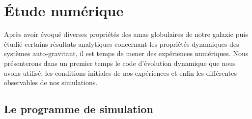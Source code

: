 \chapter{Étude numérique}
\label{Chap::Simu::Analysis}
	\minitoc

	Après avoir évoqué diverses propriétés des amas globulaires de notre galaxie puis étudié certains résultats
	analytiques concernant les propriétés dynamiques des systèmes auto-gravitant, il est temps de mener des
	expériences numériques. Nous présenterons dans un premier temps le code d'évolution dynamique que nous avons
	utilisé, les conditions initiales de nos expériences et enfin les différentes observables de nos simulations.





	\section{Le programme de simulation}

